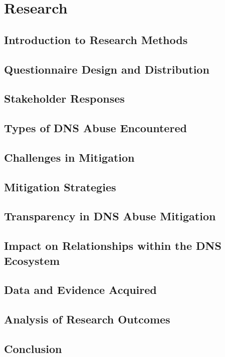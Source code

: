 \chapter{Research}

\section{Introduction to Research Methods} 
\section{Questionnaire Design and Distribution} 
\section{Stakeholder Responses} 
\section{Types of DNS Abuse Encountered} 
\section{Challenges in Mitigation} 
\section{Mitigation Strategies} 
\section{Transparency in DNS Abuse Mitigation} 
\section{Impact on Relationships within the DNS Ecosystem} 
\section{Data and Evidence Acquired} 
\section{Analysis of Research Outcomes} 
\section{Conclusion} 
